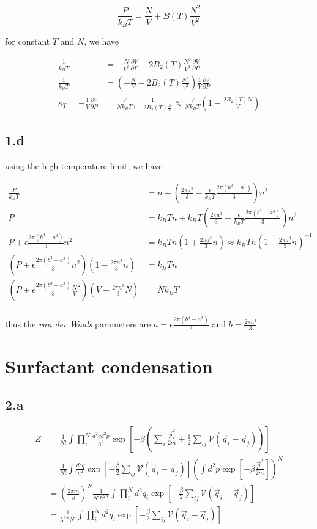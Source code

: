 \documentclass{article}
\begin{document}
$$
\frac{P}{k_B T} = \frac{N}{V} + B(T) \frac{N^2}{V^2}
$$

for constant $T$ and $N$, we have

$$
\begin{aligned}
    \frac{1}{k_B T} &= -\frac{N}{V^2} \frac{\partial V}{\partial P} - 2B_2(T) \frac{N^2}{V^3} \frac{\partial V}{\partial P}\\
    \frac{1}{k_B T} &= (-\frac{N}{V} - 2B_2(T) \frac{N^2}{V^2}) \frac{1}{V}\frac{\partial V}{\partial P}\\
    \kappa_T = -\frac{1}{V}\frac{\partial V}{\partial P} &= \frac{V}{N k_B T} \frac{1}{1 + 2B_2(T) \frac{N}{V}} \approx \frac{V}{N k_B T}(1 - \frac{2B_2(T)N}{V})
\end{aligned}
$$

\subsection*{1.d}
using the high temperature limit, we have

$$
\begin{aligned}
    \frac{P}{k_B T} &= n + (\frac{2\pi a^3}{3} - \frac{\epsilon}{k_B T} \frac{2\pi (b^3 - a^3)}{3}) n^2\\
    P &= k_B T n + k_B T(\frac{2\pi a^3}{3} - \frac{\epsilon}{k_B T} \frac{2\pi (b^3 - a^3)}{3}) n^2\\
    P + \epsilon \frac{2\pi (b^3 - a^3)}{3} n^2 &= k_B T n(1 + \frac{2\pi a^3}{3} n) \approx k_B T n(1 - \frac{2\pi a^3}{3} n)^{-1}\\
    (P + \epsilon \frac{2\pi (b^3 - a^3)}{3} n^2)(1 - \frac{2\pi a^3}{3} n) &= k_B T n\\
    (P + \epsilon \frac{2\pi (b^3 - a^3)}{3} \frac{N}{V}^2)(V - \frac{2\pi a^3}{3} N) &= N k_B T\\
\end{aligned}
$$

thus the \textit{van der Waals} parameters are $a = \epsilon \frac{2\pi (b^3 - a^3)}{3}$ and $b = \frac{2\pi a^3}{3}$

\section*{Surfactant condensation}
\subsection*{2.a}

$$
\begin{aligned}
    Z &= \frac{1}{N!}\int \prod_i^N \frac{d^2q d^2p}{h^2} \exp[-\beta(\sum_i \frac{\vec{p}_i^2}{2m} + \frac{1}{2}\sum_{ij}\mathcal{V}(\vec{q}_i - \vec{q}_j))]\\
    &=\frac{1}{N!}\int \frac{d^2q}{h^2} \exp[-\frac{\beta}{2}\sum_{ij}\mathcal{V}(\vec{q}_i - \vec{q}_j)] (\int d^2p \exp[-\beta\frac{\vec{p}^2}{2m}])^N\\
    &=(\frac{2\pi m}{\beta})^N\frac{1}{N!h^{2N}}\int \prod_i^N d^2q_i \exp[-\frac{\beta}{2}\sum_{ij}\mathcal{V}(\vec{q}_i - \vec{q}_j)]\\
    &=\frac{1}{\lambda^{2N} N!} \int \prod_i^N d^2q_i \exp[-\frac{\beta}{2}\sum_{ij}\mathcal{V}(\vec{q}_i - \vec{q}_j)]
\end{aligned}
$$
\end{document}
